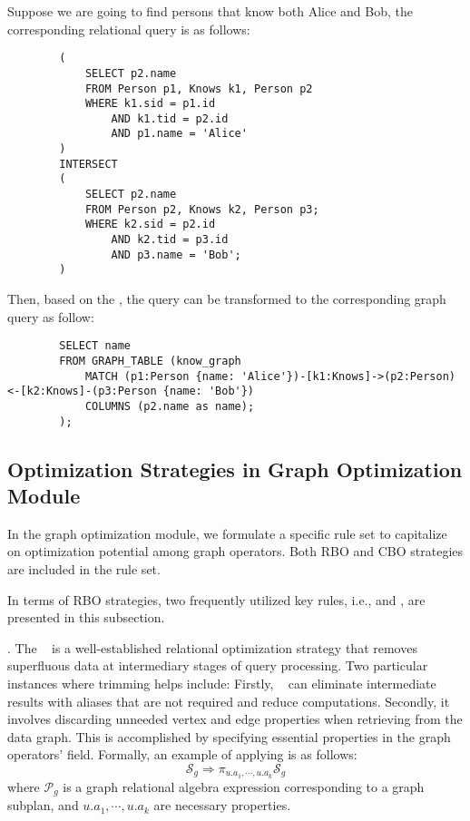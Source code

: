 \begin{example}
    Suppose we are going to find persons that know both Alice and Bob, the corresponding relational query is as follows:
    \begin{lstlisting}
        (
            SELECT p2.name
            FROM Person p1, Knows k1, Person p2
            WHERE k1.sid = p1.id
                AND k1.tid = p2.id
                AND p1.name = 'Alice'
        )
        INTERSECT
        (
            SELECT p2.name
            FROM Person p2, Knows k2, Person p3;
            WHERE k2.sid = p2.id
                AND k2.tid = p3.id
                AND p3.name = 'Bob';
        )
    \end{lstlisting}
    Then, based on the \intersectrule, the query can be transformed to the corresponding graph query as follow:
    \begin{lstlisting}
        SELECT name 
        FROM GRAPH_TABLE (know_graph
            MATCH (p1:Person {name: 'Alice'})-[k1:Knows]->(p2:Person)<-[k2:Knows]-(p3:Person {name: 'Bob'})
            COLUMNS (p2.name as name);
        );
    \end{lstlisting}
\end{example}



\subsection{Optimization Strategies in Graph Optimization Module}

In the graph optimization module, we formulate a specific rule set to capitalize on optimization potential among graph operators. 
Both RBO and CBO strategies are included in the rule set.

In terms of RBO strategies, two frequently utilized key rules, i.e., \trimrule and \fusionrule, are presented in this subsection.

\trimrule. 
The \trimrule~ is a well-established relational optimization strategy that removes superfluous data at intermediary stages of query processing. 
Two particular instances where trimming helps include: 
Firstly, \trimrule~ can eliminate intermediate results with aliases that are not required and reduce computations.
Secondly, it involves discarding unneeded vertex and edge properties when retrieving from the data graph. 
This is accomplished by specifying essential properties in the graph operators’  field.
Formally, an example of applying \trimrule is as follows:
\begin{equation}
    \mathcal{S}_g \Rightarrow \pi_{u.a_1, \cdots, u.a_k}\mathcal{S} _g 
\end{equation}
where $\mathcal{P}_g$ is a graph relational algebra expression corresponding to a graph subplan, and $u.a_1, \cdots, u.a_k$ are necessary properties.


